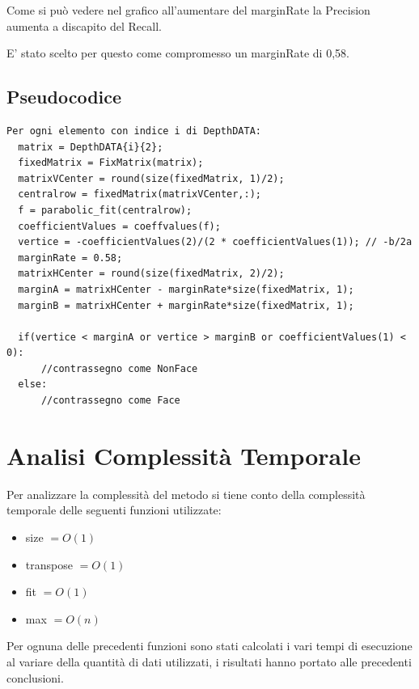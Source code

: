 \documentclass[
  italian,
]{article}
\providecommand{\tightlist}{%
  \setlength{\itemsep}{0pt}\setlength{\parskip}{0pt}}
\begin{document}
Come si può vedere nel grafico all'aumentare del marginRate la Precision
aumenta a discapito del Recall.

E' stato scelto per questo come compromesso un marginRate di 0,58.

\pagebreak 

\hypertarget{pseudocodice}{%
\subsection{Pseudocodice}\label{pseudocodice}}

\begin{lstlisting}
Per ogni elemento con indice i di DepthDATA:
  matrix = DepthDATA{i}{2}; 
  fixedMatrix = FixMatrix(matrix);
  matrixVCenter = round(size(fixedMatrix, 1)/2);
  centralrow = fixedMatrix(matrixVCenter,:);
  f = parabolic_fit(centralrow);
  coefficientValues = coeffvalues(f);
  vertice = -coefficientValues(2)/(2 * coefficientValues(1)); // -b/2a
  marginRate = 0.58;
  matrixHCenter = round(size(fixedMatrix, 2)/2);
  marginA = matrixHCenter - marginRate*size(fixedMatrix, 1);
  marginB = matrixHCenter + marginRate*size(fixedMatrix, 1);
  
  if(vertice < marginA or vertice > marginB or coefficientValues(1) < 0):
      //contrassegno come NonFace
  else:
      //contrassegno come Face
\end{lstlisting}


\hypertarget{analisi-complessituxe0-temporale}{%
\section{Analisi Complessità
Temporale}\label{analisi-complessituxe0-temporale}}

Per analizzare la complessità del metodo si tiene conto della
complessità temporale delle seguenti funzioni utilizzate:

\begin{itemize}
\tightlist
\item
  size \(= O(1)\)
\item
  transpose \(= O(1)\)
\item
  fit \(= O(1)\)
\item
  max \(= O(n)\)
\end{itemize}

Per ognuna delle precedenti funzioni sono stati calcolati i vari tempi
di esecuzione al variare della quantità di dati utilizzati, i risultati
hanno portato alle precedenti conclusioni.
\end{document}
